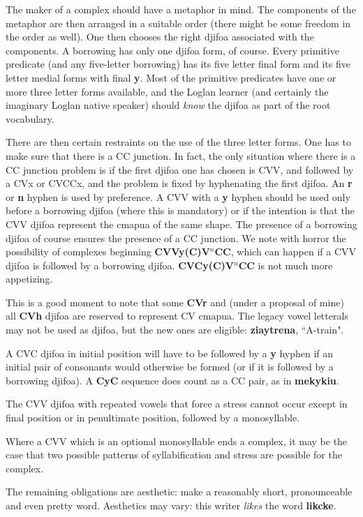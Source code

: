 \documentclass[12pt]{book}
\begin{document}
{The maker of a complex should have a metaphor in mind.  The components of the metaphor are then arranged in a suitable order (there might be some freedom in the order
as well).  One then chooses the right djifoa associated with the components.   A borrowing has only one djifoa form, of course.  Every primitive predicate (and any five-letter borrowing) has its five letter final form
and its five letter medial forms with final {\bf y}.  Most of the primitive predicates have one or more three letter forms available, and the Loglan learner (and certainly the imaginary Loglan native speaker) should {\em know\/} the djifoa as part of the root vocabulary.

There are then certain restraints on the use of the three letter forms.  One has to make sure that there is a CC junction.  In fact, the only situation where there is a CC
junction problem  is if the first djifoa one has chosen is CVV, and followed by a CVx or CVCCx, and the problem is fixed by hyphenating the first djifoa.  An {\bf r} or {\bf n} hyphen is used by preference.  A CVV with a {\bf y} hyphen should be used only before a borrowing djifoa (where this is mandatory) or if the intention is that the CVV djifoa represent the cmapua of the same shape.  The presence of a borrowing djifoa of course ensures the presence of a CC junction.  We note with horror the possibility of complexes beginning  {\bf CVVy(C)V$^n$CC}, which can happen if a CVV djifoa is followed by a borrowing djifoa.  {\bf CVCy(C)V$^n$CC} is not much more appetizing.

This is a good moment to note that some {\bf CVr} and (under a proposal of mine) all {\bf CVh} djifoa are reserved to represent CV cmapua.  The legacy vowel letterals may not be used as djifoa, but the new ones are eligible:  {\bf ziaytrena}, ``A-train".

A CVC djifoa in initial position will have to be followed by a {\bf y} hyphen if an initial pair of consonants would otherwise be formed (or if it is followed by a borrowing djifoa).
A {\bf CyC} sequence does count as a CC pair, as in {\bf mekykiu}.

The CVV djifoa with repeated vowels that force a stress cannot occur except in final position or in penultimate position, followed by a monosyllable.

Where a CVV which is an optional monosyllable ends a complex, it may be the case that two possible patterns of syllabification and stress are possible for the complex.

The remaining obligations are aesthetic:  make a reasonably short, pronounceable and even pretty word.  Aesthetics may vary:  this writer {\em likes} the word {\bf likcke}.

}
\end{document}
